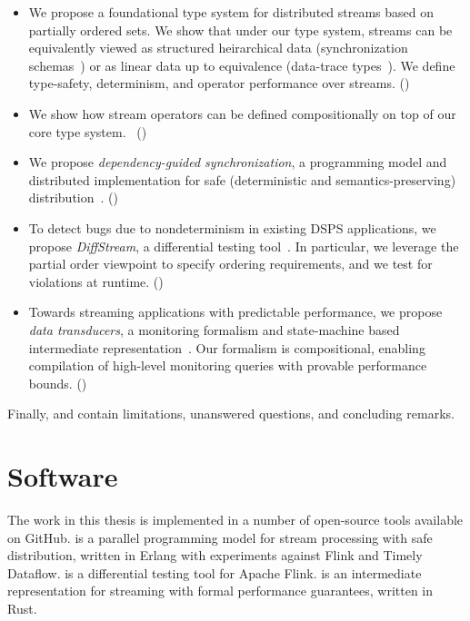 \begin{itemize}
\item
We propose a foundational type system for distributed streams based on partially ordered sets.
We show that under our type system, streams can be equivalently viewed as structured heirarchical data (synchronization schemas~) or as linear data up to equivalence (data-trace types~).
We define type-safety, determinism, and operator performance over streams. ()

\item
We show how stream operators can be defined compositionally on top of our core type system.~ ()

\item
We propose \emph{dependency-guided synchronization},
a programming model and distributed implementation for safe (deterministic and semantics-preserving) distribution~.
()

\item
To detect bugs due to nondeterminism in existing DSPS applications,
we propose \emph{DiffStream}, a differential testing tool~.
In particular, we leverage the partial order viewpoint to specify
ordering requirements, and we test for violations at runtime.
()

\item
Towards streaming applications with predictable performance,
we propose \emph{data transducers}, a monitoring formalism and state-machine based intermediate representation~.
Our formalism is compositional, enabling compilation of high-level
monitoring queries with provable performance bounds.
()
\end{itemize}

Finally,  and  contain limitations, unanswered questions, and concluding remarks.

\section{Software}

The work in this thesis is implemented in a number of open-source tools available on GitHub.
 is a parallel programming model for stream processing with safe distribution, written in Erlang with experiments against Flink and Timely Dataflow.
 is a differential testing tool for Apache Flink.
 is an intermediate representation for streaming with formal performance guarantees, written in Rust.

